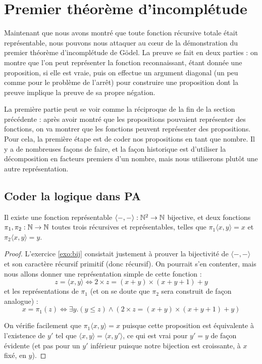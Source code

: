 \section{Premier théorème d'incomplétude}

Maintenant que nous avons montré que toute fonction récursive totale était représentable, nous pouvons nous attaquer au c\oe ur de la démonstration du premier théorème d'incomplétude de Gödel. La preuve se fait en deux parties : on montre que l'on peut représenter la fonction reconnaissant, étant donnée une proposition, si elle est vraie, puis on effectue un argument diagonal (un peu comme pour le problème de l'arrêt) pour construire une proposition dont la preuve implique la preuve de sa propre négation.

La première partie peut se voir comme la réciproque de la fin de la section précédente : après avoir montré que les propositions pouvaient représenter des fonctions, on va montrer que les fonctions peuvent représenter des propositions. Pour cela, la première étape est de coder nos propositions en tant que nombre. Il y a de nombreuses façons de faire, et la façon historique est d'utiliser la décomposition en facteurs premiers d'un nombre, mais nous utiliserons plutôt une autre représentation.

\subsection{Coder la logique dans PA}

\begin{defi}
    Il existe une fonction représentable $\langle -,-\rangle : \mathbb{N}^2 \to \mathbb{N}$ bijective, et deux fonctions $\pi_1,\pi_2 : \mathbb{N}\to\mathbb{N}$ toutes trois récursives et représentables, telles que $\pi_1\langle x,y\rangle = x$ et $\pi_2\langle x,y\rangle = y$.
\end{defi}

\begin{proof}
    L'exercice \ref{exo:bij} consistait justement à prouver la bijectivité de $\langle -,-\rangle$ et son caractère récursif primitif (donc récursif). On pourrait s'en contenter, mais nous allons donner une représentation simple de cette fonction : $$z= \langle x,y\rangle \iff 2\times z = (x+y)\times (x+y+1)+y$$ et les représentations de $\pi_1$ (et on se doute que $\pi_2$ sera construit de façon analogue) : $$x = \pi_1(z) \iff \exists y. (y\leq z) \land (2\times z = (x+y)\times (x+y+1)+y)$$

    On vérifie facilement que $\pi_1\langle x,y\rangle = x$ puisque cette proposition est équivalente à l'existence de $y'$ tel que $\langle x,y\rangle = \langle x,y'\rangle$, ce qui est vrai pour $y'=y$ de façon évidente (et pas pour un $y'$ inférieur puisque notre bijection est croissante, à $x$ fixé, en $y$).
\end{proof}

